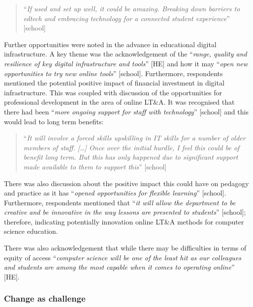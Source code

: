 \documentclass[sigconf]{acmart}
\begin{document}
\begin{quotation}
``{\emph{If used and set up well, it could be amazing.  Breaking down
barriers to edtech and embracing technology for a connected student
experience}}'' [school]
\end{quotation}

Further opportunities were noted in the advance in educational digital
infrastructure. A key theme was the acknowledgement of the
``{\emph{range, quality and resilience of key digital infrastructure
and tools}}'' [HE] and how it may ``{\emph{open new opportunities to
try new online tools}}'' [school]. Furthermore, respondents mentioned
the potential positive impact of financial investment in digital
infrastructure. This was coupled with discussion of the opportunities
for professional development in the area of online LT\&A. It was
recognised that there had been ``{\emph{more ongoing support for staff
with technology}}'' [school] and this would lead to long term
benefits:

\begin{quotation}
``{\emph{It will involve a forced skills upskilling in IT skills for a
number of older members of staff. […] Once over the initial hurdle, I
feel this could be of benefit long term. But this has only happened
due to significant support made available to them to support this}}''
[school]
\end{quotation}


There was also discussion about the positive impact this could have on
pedagogy and practice as it has ``{\emph{opened opportunities for
    flexible learning}}” [school]. Furthermore, respondents mentioned that
``{\emph{it will allow the department to be creative and be innovative
in the way lessons are presented to students}}'' [school]; therefore,
indicating potentially innovation online LT\&A methods for computer
science education.

There was also acknowledgement that while there may be difficulties in
terms of equity of access ``{\emph{computer science will be one of the
least hit as our colleagues and students are among the most capable
when it comes to operating online}}'' [HE].

\subsubsection{Change as challenge}
\end{document}

